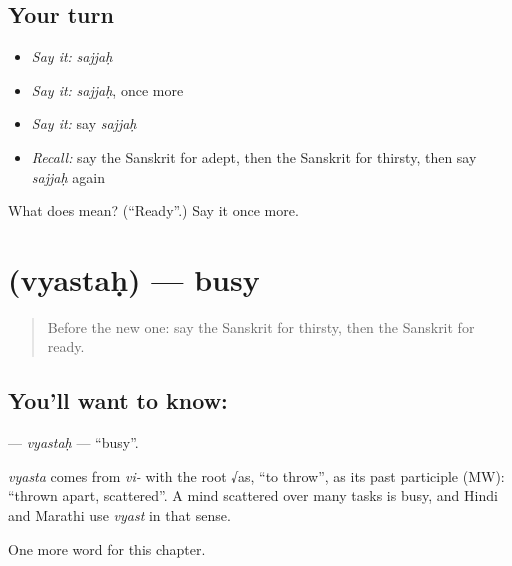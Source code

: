 \subsection*{Your turn}
\begin{itemize}
\raggedright
  \item \emph{Say it:} \emph{sajjaḥ}
  \item \emph{Say it:} \emph{sajjaḥ}, once more
  \item \emph{Say it:} say \emph{sajjaḥ}
  \item \emph{Recall:} say the Sanskrit for adept, then the Sanskrit for thirsty, then say \emph{sajjaḥ} again
\end{itemize}

\begin{tcolorbox}[breakable,colback=teal!4,colframe=teal!35!black,title={Before you move on}]
What does  mean? (\textquotedblleft{}Ready\textquotedblright{}.) Say it once more.
\end{tcolorbox}
\section[\texorpdfstring{\sk{व्यस्तः} (vyastaḥ)}{व्यस्तः (vyastaḥ)}]{ (vyastaḥ) — busy}

\label{lesson:SA-C188-vyastah}



\begin{quote}
Before the new one: say the Sanskrit for thirsty, then the Sanskrit for ready.
\end{quote}

\subsection*{You'll want to know: }
\textbf{} — \emph{vyastaḥ} — \textquotedblleft{}busy\textquotedblright{}.

\begin{cousinweb}
\emph{vyasta} comes from \emph{vi-} with the root √as, \textquotedblleft{}to throw\textquotedblright{}, as its past participle (MW): \textquotedblleft{}thrown apart, scattered\textquotedblright{}. A mind scattered over many tasks is busy, and Hindi and Marathi use \emph{vyast} in that sense.
\end{cousinweb}

\begin{grammarlens}[title={What you've built}]
One more word for this chapter.
\end{grammarlens}

